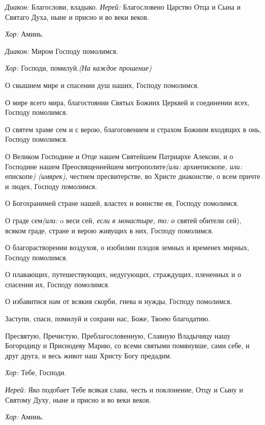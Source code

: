  {\itshape Диакон:} Благослови, владыко. {\itshape Иерей:} Благословено Царство Отца и Сына и Святаго Духа, ныне и присно и во веки веков. 

 {\itshape Хор:} Аминь. 


 {\itshape Диакон:} Миром Господу помолимся. 

 {\itshape Хор:} Господи, помилуй.{\itshape  (На каждое прошение)}

 О свышнем мире и спасении душ наших, Господу помолимся. 

 О мире всего мира, благостоянии Святых Божиих Церквей и соединении всех, Господу помолимся.

 О святем храме сем и с верою, благоговением и страхом Божиим входящих в онь, Господу помолимся. 

 О Великом Господине и Отце нашем Святейшем Патриархе Алексии, и о Господине нашем Преосвященнейшем митрополите{\itshape  (или:} архиепископе{\itshape , или:} епископе{\itshape ) (имярек)}, честнем пресвитерстве, во Христе диаконстве, о всем причте и людех, Господу помолимся. 

 О Богохранимей стране нашей, властех и воинстве ея, Господу помолимся.

 О граде сем{\itshape  (или:} o веси сей{\itshape , если в монастыре, то: о} святей обители сей), всяком граде, стране и верою живущих в них, Господу помолимся. 

 О благорастворении воздухов, о изобилии плодов земных и временех мирных, Господу помолимся.

 О плавающих, путешествующих, недугующих, страждущих, плененных и о спасении их, Господу помолимся. 

 О избавитися нам от всякия скорби, гнева и нужды, Господу помолимся. 

 Заступи, спаси, помилуй и сохрани нас, Боже, Твоею благодатию. 

 Пресвятую, Пречистую, Преблагословенную, Славную Владычицу нашу Богородицу и Приснодеву Марию, со всеми святыми помянувше, сами себе, и друг друга, и весь живот наш Христу Богу предадим. 

 {\itshape Хор:} Тебе, Господи. 

 {\itshape Иерей:} Яко подобает Тебе всякая слава, честь и поклонение, Отцу и Сыну и Святому Духу, ныне и присно и во веки веков. 

 {\itshape Хор:} Аминь. 


